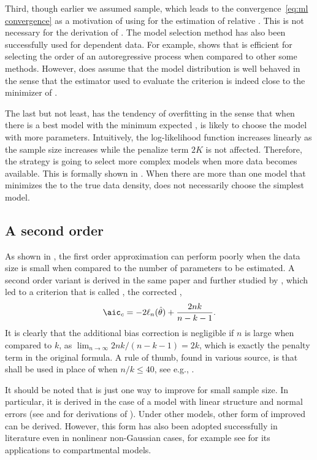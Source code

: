 Third, though earlier we assumed \iid sample, which leads to the
convergence~\ref{eq:ml convergence} as a motivation of using \mle for the
estimation of relative \kld. This is not necessary for the derivation of \aic.
The \aic model selection method has also been successfully used for dependent
data. For example, \cite{Lee:2001tm} shows that \aic is efficient for
selecting the order of an autoregressive process when compared to other some
methods. However, \aic does assume that the model distribution
is well behaved in the sense that the estimator used to evaluate the criterion
is indeed close to the minimizer of \kld.

The last but not least, \aic has the tendency of overfitting in the sense that
when there is a best model with the minimum expected \kld, \aic is likely to
choose the model with more parameters. Intuitively, the log-likelihood
function increases linearly as the sample size increases while the penalize
term $2K$ is not affected. Therefore, the \aic strategy is going to select
more complex models when more data becomes available. This is formally shown
in \cite{Sin:1996vs}. When there are more than one model that minimizes the
\kld to the true data density, \aic does not necessarily choose the simplest
model.

\subsection{A second order \protect\aic}
\label{sub:A second order aic}

As shown in \cite{Sugiura:1978be}, the first order approximation can perform
poorly when the data size is small when compared to the number of parameters
to be estimated. A second order variant is derived in the same paper and
further studied by \cite{Hurvich:1989ev}, which led to a criterion that is
called \aicc, the corrected \aic,
\begin{equation}
  \aicc = -2\ell_n(\hat\theta) + \frac{2nk}{n-k-1}.
\end{equation}
It is clearly that the additional bias correction is negligible if $n$ is
large when compared to $k$, as $\lim_{n\to\infty}2nk/(n-k-1) = 2k$, which is
exactly the penalty term in the original \aic formula. A rule of thumb, found
in various source, is that \aicc shall be used in place of \aic when
$n/k\le40$, see e.g., \cite[][sec.~2.4]{Burnham:2002wc}.

It should be noted that \aicc is just one way to improve \aic for small sample
size. In particular, it is derived in the case of a model with linear
structure and normal errors (see \cite{Hurvich:1989ev} and
\cite[][sec.~6.4.1]{Burnham:2002wc} for derivations of \aicc). Under other
models, other form of improved \aic can be derived. However, this form has
also been adopted successfully in literature even in nonlinear non-Gaussian
cases, for example see \cite{Turkheimer:2003iy} for its applications to \pet
compartmental models.

